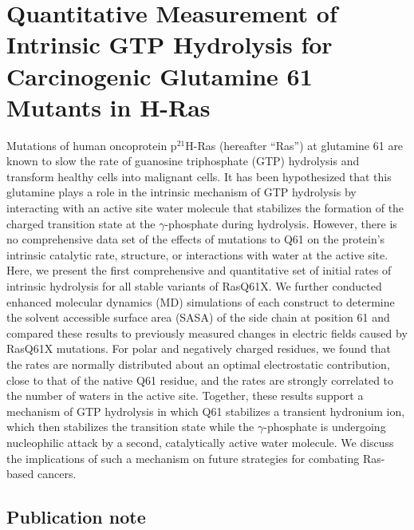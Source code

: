 \chapter{Quantitative Measurement of Intrinsic GTP Hydrolysis for
Carcinogenic Glutamine 61 Mutants in H-Ras} \label{ras}

\newcommand{\RalBSCN}{{Ral$\beta$I18C$_{\text{SCN}}$}}
\newcommand{\RalB}{{Ral$\beta$}}


Mutations of human oncoprotein p$^{21}$H-Ras (hereafter ``Ras'') at glutamine 61 are known to slow the rate of guanosine triphosphate (GTP) hydrolysis and transform healthy cells into malignant cells. 
It has been hypothesized that this glutamine plays a role in the intrinsic mechanism of GTP hydrolysis by interacting with an active site water molecule that stabilizes the formation of the charged transition state at the $\gamma$-phosphate during hydrolysis.
However, there is no comprehensive data set of the effects of mutations to Q61 on the protein's intrinsic catalytic rate, structure, or interactions with water at the active site. 
Here, we present the first comprehensive and quantitative set of initial rates of intrinsic hydrolysis for all stable variants of RasQ61X. 
We further conducted enhanced molecular dynamics (MD) simulations of each construct to determine the solvent accessible surface area (SASA) of the side chain at position 61 and compared these results to previously measured changes in electric fields caused by RasQ61X mutations. 
For polar and negatively charged residues, we found that the rates are normally distributed about an optimal electrostatic contribution, close to that of the native Q61 residue, and the rates are strongly correlated to the number of waters in the active site. 
Together, these results support a mechanism of GTP hydrolysis in which Q61 stabilizes a transient hydronium ion, which then stabilizes the transition state while the $\gamma$-phosphate is undergoing nucleophilic attack by a second, catalytically active water molecule. 
We discuss the implications of such a mechanism on future strategies for combating Ras-based cancers.

\section{Publication note} \label{ras-pub-note}

